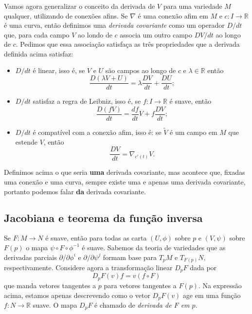 \documentclass{article}
\begin{document}
Vamos agora generalizar o conceito da derivada de $V$ para uma variedade $M$ qualquer, utilizando de conexões afins. Se $\nabla$ é uma conexão afim em $M$ e $c \colon I \to \mathbb{R}$ é uma curva, então definimos uma \textit{derivada covariante} como um operador $D/dt$ que, para cada campo $V$ ao londo de $c$ associa um outro campo $DV/dt$ ao longo de $c$. Pedimos que essa associação satisfaça as três propriedades que a derivada definida acima satisfaz: \begin{itemize}
    \item $D/dt$ é linear, isso é, se $V$ e $U$ são campos ao longo de $c$ e $\lambda \in \mathbb{R}$ então \begin{equation}
        \frac{D(\lambda V + U)}{dt}  = \lambda\frac{DV}{dt} + \frac{DU}{dt};
    \end{equation}
    
    \item $D/dt$ satisfaz a regra de Leibniz, isso é, se $f \colon I \to \mathbb{R}$ é suave, então \begin{equation}
        \frac{D(fV)}{dt} = \frac{df}{dt}V + f\frac{DV}{dt};
    \end{equation}

    \item $D/dt$ é compatível com a conexão afim, isso é: se $\tilde{V}$ é um campo em $M$ que estende $V$, então \begin{equation}
        \frac{DV}{dt} = \nabla_{c'(t)}V.
    \end{equation}
\end{itemize}

Definimos acima o que seria \textbf{uma} derivada covariante, mas acontece que, fixadas uma conexão e uma curva, sempre existe uma e apenas uma derivada covariante, portanto podemos falar \textbf{da} derivada covariante.

\subsection{Jacobiana e teorema da função inversa}

Se $F \colon M \to N$ é suave, então para todas as carta $(U, \phi)$ sobre $p$ e $(V, \psi)$ sobre $F(p)$ o mapa $\psi \circ F \circ \phi^{-1}$ é suave. Sabemos da teoria de variedades que as derivadas parciais $\partial/\partial \phi^i$ e $\partial/\partial \psi^j$ formam base para $T_pM$ e $T_{F(p)}N$, respectivamente. Considere agora a transformação linear $D_pF$ dada por \begin{equation}
    D_pF(v) f = v(f \circ F)
\end{equation} que manda vetores tangentes a $p$ para vetores tangentes a $F(p)$. Na expressão acima, estamos apenas descrevendo como o vetor $D_pF(v)$ age em uma função $f \colon N \to \mathbb{R}$ suave. O mapa $D_pF$ é chamado de \textit{derivada de $F$ em $p$}.
\end{document}
